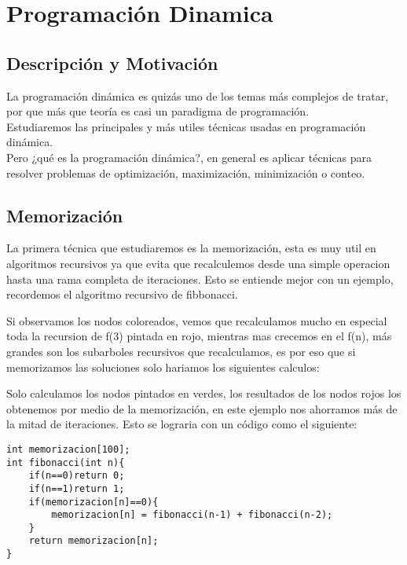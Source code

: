 \chapter{Programación Dinamica}
\section{Descripción y Motivación}

La programación dinámica es quizás uno de los temas más complejos de tratar, por que más que teoría es casi un paradigma de programación.
\\Estudiaremos las principales y más utiles técnicas usadas en programación dinámica.
\\Pero ¿qué es la programación dinámica?, en general es aplicar técnicas para resolver problemas de optimización, maximización, minimización o conteo.


\section{Memorización}
La primera técnica que estudiaremos es la memorización, esta es muy util en algoritmos recursivos ya que evita que recalculemos desde una simple operacion hasta una rama completa de iteraciones. Esto se entiende mejor con un ejemplo, recordemos el algoritmo recursivo de fibbonacci.


Si observamos los nodos coloreados, vemos que recalculamos mucho en especial toda la recursion de f(3) pintada en rojo, mientras mas crecemos en el f(n), más grandes son los subarboles recursivos que recalculamos, es por eso que si memorizamos las soluciones solo hariamos los siguientes calculos:


Solo calculamos los nodos pintados en verdes, los resultados de los nodos rojos los obtenemos por medio de la memorización, en este ejemplo nos ahorramos más de la mitad de iteraciones. Esto se lograria con un código como el siguiente:

\begin{minipage}{\textwidth}
\begin{lstlisting}[style=C,caption=fibonacciMemorizacion.cpp]
int memorizacion[100];
int fibonacci(int n){
    if(n==0)return 0;
    if(n==1)return 1;
    if(memorizacion[n]==0){
        memorizacion[n] = fibonacci(n-1) + fibonacci(n-2);
    }
    return memorizacion[n];
}
\end{lstlisting}
\end{minipage}

